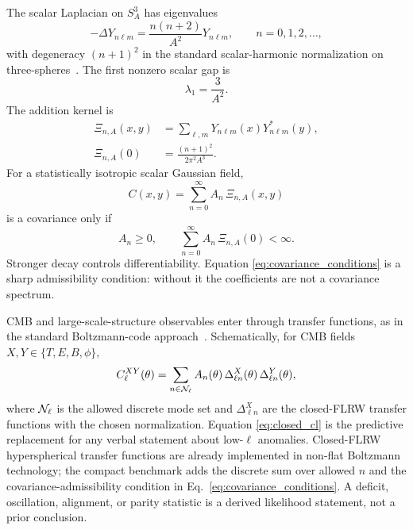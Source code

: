 \documentclass[
  aps,
  prd,
  reprint,
  superscriptaddress,
  nofootinbib,
  floatfix,
  longbibliography
]{revtex4-2}
\begin{document}
The scalar Laplacian on \(S^3_A\) has eigenvalues
\begin{equation}
  -\Delta Y_{n\ell m}
  =
  \frac{n(n+2)}{A^2}Y_{n\ell m},
  \qquad
  n=0,1,2,\ldots ,
  \label{eq:scalar_spectrum}
\end{equation}
with degeneracy \((n+1)^2\) in the standard scalar-harmonic
normalization on three-spheres~\cite{RubinOrdonez1984,AbbottSchaefer1986,Jantzen1978,Higuchi1987,LindblomTaylorZhang2017}.  The first nonzero scalar gap is
\begin{equation}
  \lambda_1=\frac{3}{A^2}.
  \label{eq:spectral_gap}
\end{equation}
The addition kernel is
\begin{equation}
\begin{split}
  \Xi_{n,A}(x,y)
  &=
  \sum_{\ell,m}Y_{n\ell m}(x)Y^*_{n\ell m}(y),
  \\
  \Xi_{n,A}(0)&=\frac{(n+1)^2}{2\pi^2A^3}.
\end{split}
  \label{eq:addition_kernel}
\end{equation}
For a statistically isotropic scalar Gaussian field,
\begin{equation}
  C(x,y)=
  \sum_{n=0}^{\infty}A_n\,\Xi_{n,A}(x,y)
  \label{eq:covariance}
\end{equation}
is a covariance only if
\begin{equation}
  A_n\ge0,
  \qquad
  \sum_{n=0}^{\infty}A_n\,\Xi_{n,A}(0)<\infty .
  \label{eq:covariance_conditions}
\end{equation}
Stronger decay controls differentiability.  Equation
\eqref{eq:covariance_conditions} is a sharp admissibility condition:
without it the coefficients are not a covariance spectrum.

CMB and large-scale-structure observables enter through transfer
functions, as in the standard Boltzmann-code approach~\cite{CLASS2011,CLASSNonFlat2014,CAMB2000}.  Schematically, for CMB fields \(X,Y\in\{T,E,B,\phi\}\),
\begin{equation}
  C_\ell^{XY}(\theta)
  =
  \sum_{n\in{\cal N}_\ell}
  A_n(\theta)\,
  \Delta_{\ell n}^{X}(\theta)\,
  \Delta_{\ell n}^{Y}(\theta),
  \label{eq:closed_cl}
\end{equation}
where \({\cal N}_\ell\) is the allowed discrete mode set and
\(\Delta_{\ell n}^{X}\) are the closed-FLRW transfer functions with the
chosen normalization.  Equation \eqref{eq:closed_cl} is the predictive
replacement for any verbal statement about low-\(\ell\) anomalies.
Closed-FLRW hyperspherical transfer functions are already implemented in
non-flat Boltzmann technology; the compact benchmark adds the discrete
sum over allowed \(n\) and the covariance-admissibility condition in
Eq.~\eqref{eq:covariance_conditions}.  A deficit, oscillation,
alignment, or parity statistic is a derived likelihood statement, not a
prior conclusion.
\end{document}
